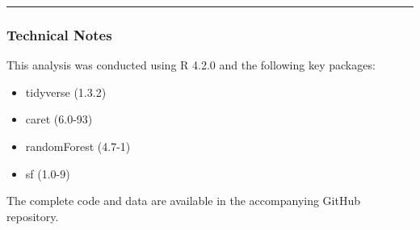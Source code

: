 \documentclass[
  letterpaper,
  DIV=11,
  numbers=noendperiod]{scrartcl}
\providecommand{\tightlist}{%
  \setlength{\itemsep}{0pt}\setlength{\parskip}{0pt}}\usepackage{longtable,booktabs,array}
\begin{document}
\begin{center}\rule{0.5\linewidth}{0.5pt}\end{center}

\subsubsection{Technical Notes}\label{technical-notes}

This analysis was conducted using R 4.2.0 and the following key
packages:

\begin{itemize}
\tightlist
\item
  tidyverse (1.3.2)
\item
  caret (6.0-93)
\item
  randomForest (4.7-1)
\item
  sf (1.0-9)
\end{itemize}

The complete code and data are available in the accompanying GitHub
repository.
\end{document}
